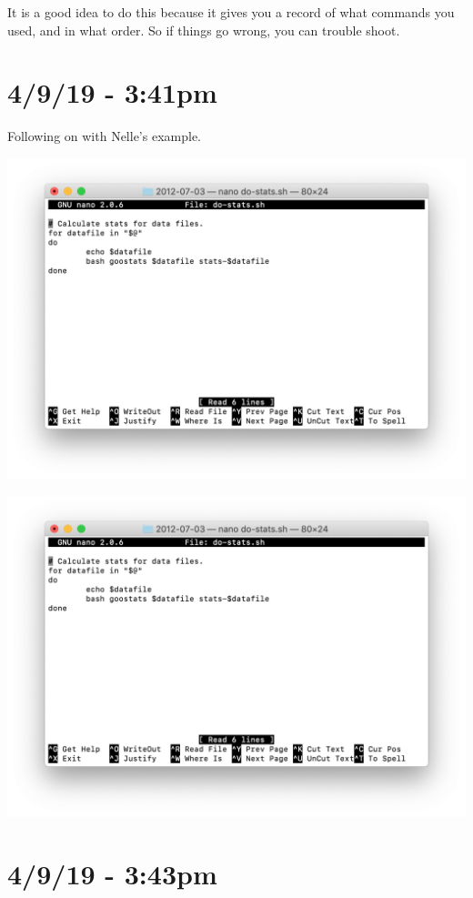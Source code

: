 \documentclass{article}
\begin{document}
It is a good idea to do this because it gives you a record of what commands you used, and in what order. So if things go wrong, you can trouble shoot.

\section*{4/9/19 - 3:41pm}

Following on with Nelle's example.

\includegraphics[width=\textwidth]{figy.png}

\includegraphics[width=\textwidth]{figz.png}

\section*{4/9/19 - 3:43pm}
\end{document}
